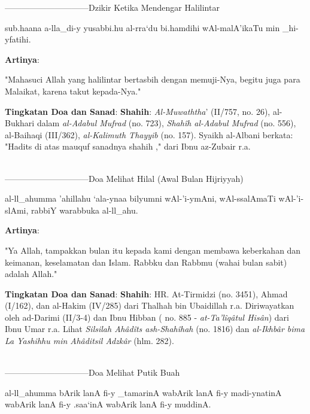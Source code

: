\documentclass[a4paper,12pt]{article}
\begin{document}
\par
{}------------------------------Dzikir Ketika Mendengar Halilintar
\begin{arabtext}
\noindent
sub.haana a-lla_di-y yusabbi.hu al-rra`du bi.hamdihi wAl-malA'ikaTu min
_hi-yfatihi.\\
\end{arabtext}
\noindent
\textbf{Artinya}:
\par
\indent
"Mahasuci Allah yang halilintar bertasbih dengan memuji-Nya, begitu juga 
para Malaikat, karena takut kepada-Nya."\\
\par
\noindent
\textbf{Tingkatan Doa dan Sanad}: \textbf{Shahih}: \textit{Al-Muwaththa}'
(II/757, no. 26), al-Bukhari dalam \textit{al-Adabul Mufrad} (no. 723),
\textit{Shah\^{i}h al-Adabul Mufrad} (no. 556), al-Baihaqi (III/362),
\textit{al-Kalimuth Thayyib} (no. 157). Syaikh al-Albani berkata: "Hadits 
di atas mauquf sanadnya shahih ," dari Ibnu az-Zubair r.a. \\\\
\par
{}------------------------------Doa Melihat Hilal (Awal Bulan Hijriyyah)
\begin{arabtext}
\noindent
al-ll_ahumma 'ahillahu `ala-ynaa bilyumni wAl-'i-ymAni, wAl-ssalAmaTi 
wAl-'i-slAmi, rabbiY warabbuka al-ll_ahu.\\
\end{arabtext}
\noindent
\textbf{Artinya}:
\par
\indent
"Ya Allah, tampakkan bulan itu kepada kami dengan membawa keberkahan dan 
keimanan, keselamatan dan Islam. Rabbku dan Rabbmu (wahai bulan sabit) 
adalah Allah."\\
\par
\noindent
\textbf{Tingkatan Doa dan Sanad}: \textbf{Shahih}: HR. At-Tirmidzi (no. 
3451), Ahmad (I/162), dan al-Hakim (IV/285) dari Thalhah bin Ubaidillah 
r.a. Diriwayatkan oleh ad-Darimi (II/3-4) dan Ibnu Hibban ( no. 885 -
\textit{at-Ta'l\^{i}q\^{a}tul His\^{a}n}) dari Ibnu Umar r.a. Lihat 
\textit{Silsilah Ah\^{a}d\^{i}ts ash-Shah\^{i}hah} (no. 1816) dan 
\textit{al-Ikhb\^{a}r bima La Yashihhu min Ah\^{a}ditsil Adzk\^{a}r} 
(hlm. 282).\\\\
\par
{}------------------------------Doa Melihat Putik Buah
\begin{arabtext}
\noindent
al-ll_ahumma bArik lanA fi-y _tamarinA wabArik lanA fi-y madi-ynatinA 
wabArik lanA fi-y .saa`inA wabArik lanA fi-y muddinA.\\
\end{arabtext}
\end{document}
